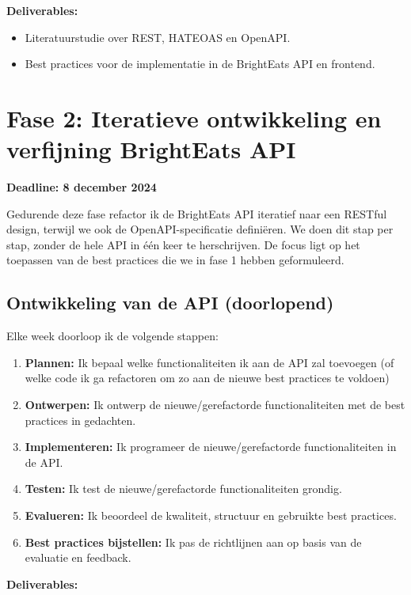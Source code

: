 \textbf{Deliverables:}

\begin{itemize}
  \item Literatuurstudie over REST, HATEOAS en OpenAPI.
  \item Best practices voor de implementatie in de Bright\-Eats API en frontend.
\end{itemize}

\section{Fase 2: Iteratieve ontwikkeling en verfijning Bright\-Eats API}

\textbf{Deadline: 8 december 2024}

\bigskip
Gedurende deze fase refactor ik de Bright\-Eats API iteratief naar een RESTful design, terwijl we ook de OpenAPI-specificatie definiëren. We doen dit stap per stap, zonder de hele API in één keer te herschrijven. De focus ligt op het toepassen van de best practices die we in fase 1 hebben geformuleerd.

\subsection{Ontwikkeling van de API (doorlopend)}

\bigskip
Elke week doorloop ik de volgende stappen:

\begin{enumerate}
  \item \textbf{Plannen:} Ik bepaal welke functionaliteiten ik aan de API zal toevoegen (of welke code ik ga refactoren om zo aan de nieuwe best practices te voldoen)
  \item \textbf{Ontwerpen:} Ik ontwerp de nieuwe/gerefactorde functionaliteiten met de best practices in gedachten.
  \item \textbf{Implementeren:} Ik programeer de nieuwe/gerefactorde functionaliteiten in de API.
  \item \textbf{Testen:} Ik test de nieuwe/gerefactorde functionaliteiten grondig.
  \item \textbf{Evalueren:} Ik beoordeel de kwaliteit, structuur en gebruikte best practices.
  \item \textbf{Best practices bijstellen:} Ik pas de richtlijnen aan op basis van de evaluatie en feedback.
\end{enumerate}

\textbf{Deliverables:}

